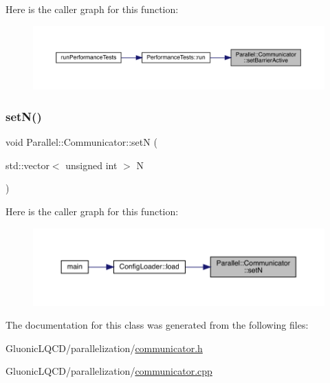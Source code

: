 Here is the caller graph for this function\+:\nopagebreak
\begin{figure}[H]
\begin{center}
\leavevmode
\includegraphics[width=350pt]{class_parallel_1_1_communicator_a13263be32405fa088f06b07f7fdfe281_icgraph}
\end{center}
\end{figure}
\mbox{\label{class_parallel_1_1_communicator_aea1c6e1ff8f4f40d3db0ac8e0b29db62}} 
\subsubsection{\texorpdfstring{setN()}{setN()}}
{\footnotesize\ttfamily void Parallel\+::\+Communicator\+::setN (\begin{DoxyParamCaption}\item[{std\+::vector$<$ unsigned int $>$}]{N }\end{DoxyParamCaption})\hspace{0.3cm}{\ttfamily [static]}}

Here is the caller graph for this function\+:\nopagebreak
\begin{figure}[H]
\begin{center}
\leavevmode
\includegraphics[width=350pt]{class_parallel_1_1_communicator_aea1c6e1ff8f4f40d3db0ac8e0b29db62_icgraph}
\end{center}
\end{figure}


The documentation for this class was generated from the following files\+:\begin{DoxyCompactItemize}
\item 
Gluonic\+L\+Q\+C\+D/parallelization/\mbox{\hyperlink{communicator_8h}{communicator.\+h}}\item 
Gluonic\+L\+Q\+C\+D/parallelization/\mbox{\hyperlink{communicator_8cpp}{communicator.\+cpp}}\end{DoxyCompactItemize}
